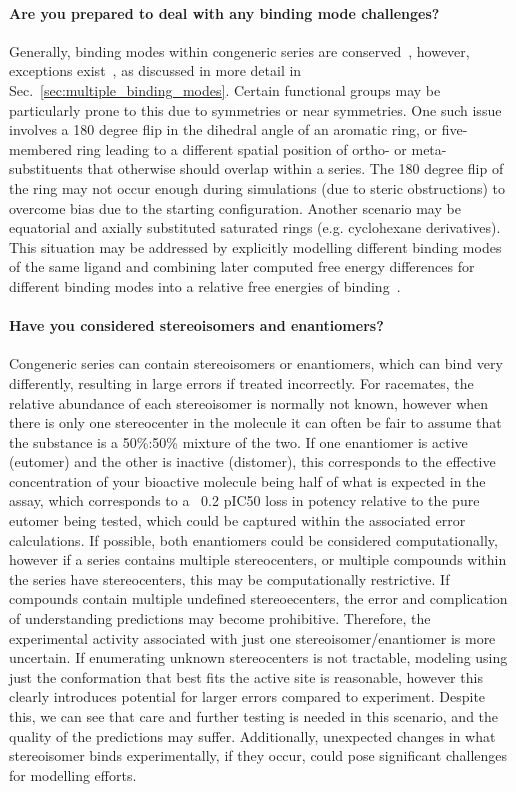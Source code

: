 \documentclass[9pt,bestpractices]{livecoms}
\begin{document}
\paragraph{Are you prepared to deal with any binding mode challenges?}
Generally, binding modes within congeneric series are conserved~\cite{wacker2010conserved}, however, exceptions exist~\cite{brandt2011congeneric,nazare2005probing}, as discussed in more detail in Sec.~\ref{sec:multiple_binding_modes}. Certain functional groups may be particularly prone to this due to symmetries or near symmetries. One such issue involves a 180 degree flip in the dihedral angle of an aromatic ring, or five-membered ring leading to a different spatial position of ortho- or meta- substituents that otherwise should overlap within a series. The 180 degree flip of the ring may not occur enough during simulations (due to steric obstructions) to overcome bias due to the starting configuration. Another scenario may be equatorial and axially substituted saturated rings (e.g. cyclohexane derivatives). This situation may be addressed by explicitly modelling different binding modes of the same ligand and combining later computed free energy differences for different binding modes into a relative free energies of binding~\cite{kaus2015how}.

\paragraph{Have you considered stereoisomers and enantiomers?}
Congeneric series can contain stereoisomers or enantiomers, which can bind very differently, resulting in large errors if treated incorrectly. For racemates, the relative abundance of each stereoisomer is normally not known, however when there is only one stereocenter in the molecule it can often be fair to assume that the substance is a 50\%:50\% mixture of the two. If one enantiomer is active (eutomer) and the other is inactive (distomer), this corresponds to the effective concentration of your bioactive molecule being half of what is expected in the assay, which corresponds to a ~0.2 pIC50 loss in potency relative to the pure eutomer being tested, which could be captured within the associated error calculations.\cite{h2011significance} If possible, both enantiomers could be considered computationally, however if a series contains multiple stereocenters, or multiple compounds within the series have stereocenters, this may be computationally restrictive. If compounds contain multiple undefined stereoecenters, the error and complication of understanding predictions may become prohibitive. Therefore, the experimental activity associated with just one stereoisomer/enantiomer is more uncertain. If enumerating unknown stereocenters is not tractable, modeling using just the conformation that best fits the active site is reasonable, however this clearly introduces potential for larger errors compared to experiment. Despite this, we can see that care and further testing is needed in this scenario, and the quality of the predictions may suffer. Additionally, unexpected changes in what stereoisomer binds experimentally, if they occur, could pose significant challenges for modelling efforts.
\end{document}
